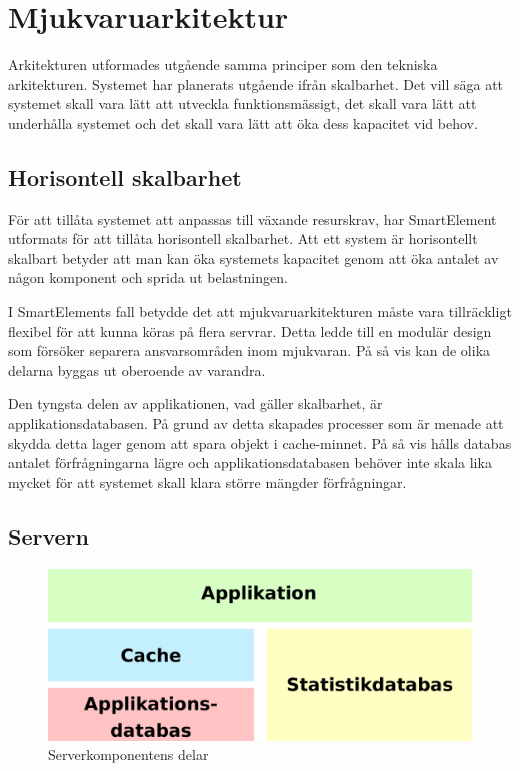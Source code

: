 \section{Mjukvaruarkitektur}

Arkitekturen utformades utgående samma principer som den tekniska arkitekturen. Systemet har planerats utgående ifrån skalbarhet. Det vill säga att systemet skall vara lätt att utveckla funktionsmässigt, det skall vara lätt att underhålla systemet och det skall vara lätt att öka dess kapacitet vid behov. \citep[s. 203]{scalableweb}

\subsection{Horisontell skalbarhet}

För att tillåta systemet att anpassas till växande resurskrav, har SmartElement utformats för att tillåta horisontell skalbarhet. Att ett system är horisontellt skalbart betyder att man kan öka systemets kapacitet genom att öka antalet av någon komponent och sprida ut belastningen.\citep[s. 205-207]{scalableweb}

I SmartElements fall betydde det att mjukvaruarkitekturen måste vara tillräckligt flexibel för att kunna köras på flera servrar. Detta ledde till en modulär design som försöker separera ansvarsområden inom mjukvaran. På så vis kan de olika delarna byggas ut oberoende av varandra.

Den tyngsta delen av applikationen, vad gäller skalbarhet, är applikationsdatabasen. På grund av detta skapades processer som är menade att skydda detta lager genom att spara objekt i cache-minnet. På så vis hålls databas antalet förfrågningarna lägre och applikationsdatabasen behöver inte skala lika mycket för att systemet skall klara större mängder förfrågningar.

\subsection{Servern}

\begin{figure}[h!]
\centering
\includegraphics[width=120mm]{assets/images/smelementbackendparts.png}
\caption{Serverkomponentens delar}
\label{abstractbackend}
\end{figure}

